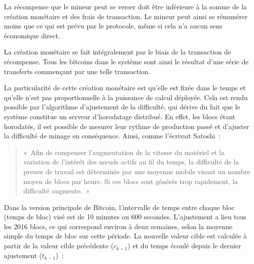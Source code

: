 La récompense que le mineur peut se verser doit être inférieure à la somme de la création monétaire et des frais de transaction. Le mineur peut ainsi se rémunérer moins que ce qui est prévu par le protocole, même si cela n'a aucun sens économique direct.


La création monétaire se fait intégralement par le biais de la transaction de récompense. Tous les bitcoins dans le système sont ainsi le résultat d'une série de transferts commençant par une telle transaction.


La particularité de cette création monétaire est qu'elle est fixée dans le temps et qu'elle n'est pas proportionnelle à la puissance de calcul déployée. Cela est rendu possible par l'algorithme d'ajustement de la difficulté, qui dérive du fait que le système constitue un serveur d'horodatage distribué. En effet, les blocs étant horodatés, il est possible de mesurer leur rythme de production passé et d'ajuster la difficulté de minage en conséquence. Ainsi, comme l'écrivait Satoshi~:

\begin{quote}
«~Afin de compenser l'augmentation de la vitesse du matériel et la variation de l'intérêt des nœuds actifs au fil du temps, la difficulté de la preuve de travail est déterminée par une moyenne mobile visant un nombre moyen de blocs par heure. Si ces blocs sont générés trop rapidement, la difficulté augmente.~»
\end{quote}

Dans la version principale de Bitcoin, l'intervalle de temps entre chaque bloc (temps de bloc) visé est de 10 minutes ou 600 secondes. L'ajustement a lieu tous les 2016 blocs, ce qui correspond environ à deux semaines, selon la moyenne simple du temps de bloc sur cette période. La nouvelle valeur cible est calculée à partir de la valeur cible précédente ($c_{k-1}$) et du temps écoulé depuis le dernier ajustement ($t_{k-1}$)~:

